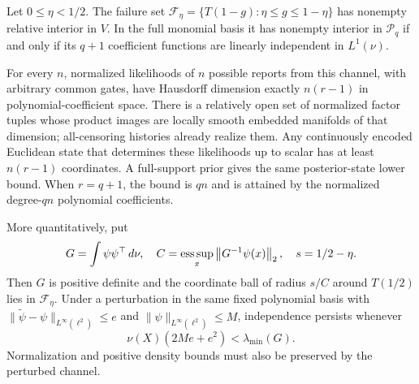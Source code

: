 \begin{theorem}\label{thm:rank}
Let $0\le\eta<1/2$. The failure set
$\mathcal F_\eta=\{T(1-g):\eta\le g\le1-\eta\}$ has nonempty relative interior in $V$. In the full monomial basis it has nonempty interior in $\mathcal P_q$ if and only if its $q+1$ coefficient functions are linearly independent in $L^1(\nu)$.

For every $n$, normalized likelihoods of $n$ possible reports from this channel, with arbitrary common gates, have Hausdorff dimension exactly $n(r-1)$ in polynomial-coefficient space. There is a relatively open set of normalized factor tuples whose product images are locally smooth embedded manifolds of that dimension; all-censoring histories already realize them. Any continuously encoded Euclidean state that determines these likelihoods up to scalar has at least $n(r-1)$ coordinates. A full-support prior gives the same posterior-state lower bound. When $r=q+1$, the bound is $qn$ and is attained by the normalized degree-$qn$ polynomial coefficients.

More quantitatively, put
\[
 G=\int\psi\psi^\top\,d\nu,\quad C=\mathop{\rm ess\,sup}_x\left\lVert G^{-1}\psi(x)\right\rVert_2,
 \quad s=1/2-\eta.
\]
Then $G$ is positive definite and the coordinate ball of radius $s/C$ around $T(1/2)$ lies in $\mathcal F_\eta$. Under a perturbation in the same fixed polynomial basis with
$\|\widetilde\psi-\psi\|_{L^\infty(\ell^2)}\le e$ and $\|\psi\|_{L^\infty(\ell^2)}\le M$, independence persists whenever
\begin{equation}
 \nu(X)(2Me+e^2)<\lambda_{\min}(G).
 \label{eq:rank-stability}
\end{equation}
Normalization and positive density bounds must also be preserved by the perturbed channel.
\end{theorem}
